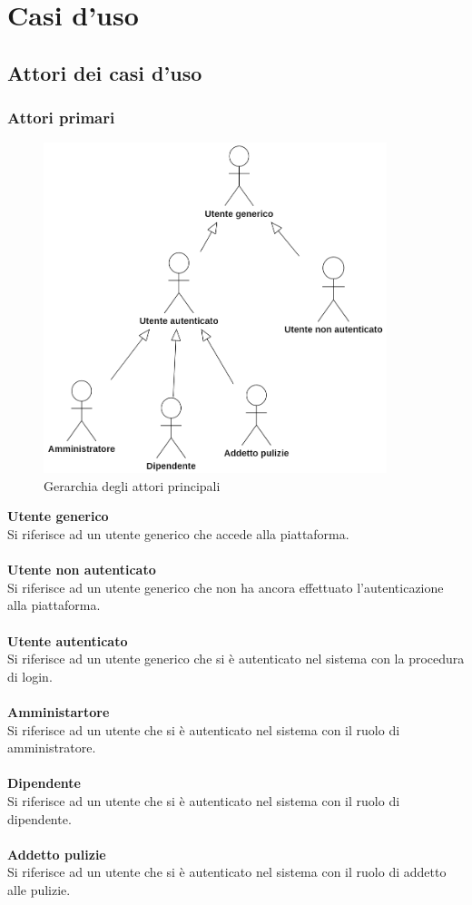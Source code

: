 \section{Casi d'uso}

\subsection{Attori dei casi d'uso}

\subsubsection{Attori primari}
\begin{figure}[H]
		\centering
		\includegraphics[width=10cm]{res/images/utentigenerali.png}
		\caption{Gerarchia degli attori principali}
		\label{fig:Gerarchia attori principali}
	\end{figure}

\textbf{Utente generico}\\
Si riferisce ad un utente generico che accede alla piattaforma.\\
\\
\textbf{Utente non autenticato}\\
Si riferisce ad un utente generico che non ha ancora effettuato l’autenticazione alla piattaforma.\\
\\
\textbf{Utente autenticato}\\
Si riferisce ad un utente generico che si è autenticato nel sistema con la procedura di login.\\
\\
\textbf{Amministartore}\\
Si riferisce ad un utente che si è autenticato nel sistema con il ruolo di amministratore.\\
\\
\textbf{Dipendente}\\
Si riferisce ad un utente che si è autenticato nel sistema con il ruolo di dipendente.\\
\\
\textbf{Addetto pulizie}\\
Si riferisce ad un utente che si è autenticato nel sistema con il ruolo di addetto alle pulizie.\\

